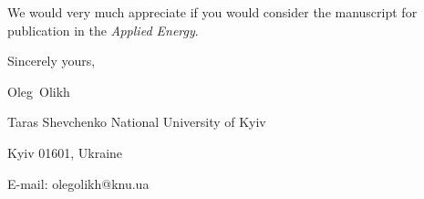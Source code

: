 \documentclass[preprint]{elsarticle}
\begin{document}
We would  very much appreciate if you would consider the manuscript for publication in the \emph{Applied Energy}.

%


\vspace{3mm}

Sincerely yours,

Oleg~Olikh


Taras Shevchenko National University of Kyiv


Kyiv 01601, Ukraine

E-mail: olegolikh@knu.ua


\end{document}
